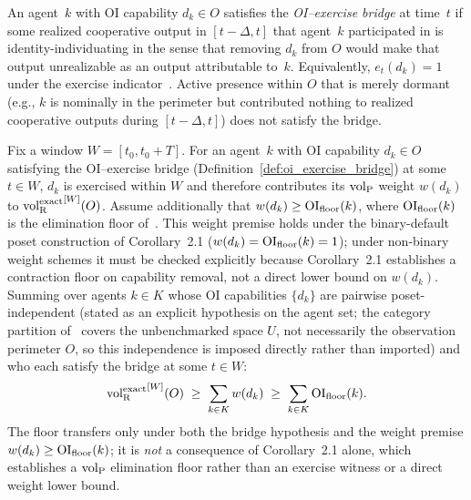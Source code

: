 \begin{definition}
\label{def:oi_exercise_bridge}
An agent~$k$ with OI capability $d_k \in O$ satisfies the
\emph{OI--exercise bridge} at time~$t$ if some realized
cooperative output in $[t-\Delta, t]$ that agent~$k$
participated in is identity-individuating in the sense that
removing $d_k$ from $O$ would make that output unrealizable as
an output attributable to~$k$.  Equivalently,
$e_t(d_k) = 1$ under
the exercise indicator~\citep[Revealed~Sacrifice]{lasser2026paper8a}.  Active presence within
$O$ that is merely dormant (e.g., $k$ is nominally in the
perimeter but contributed nothing to realized cooperative
outputs during $[t-\Delta, t]$) does not satisfy the bridge.
\end{definition}

\begin{proposition}
\label{prop:oi_floor}
Fix a window $W = [t_0, t_0 + T]$.  For an agent~$k$ with OI
capability $d_k \in O$ satisfying the OI--exercise bridge
(Definition~\ref{def:oi_exercise_bridge}) at some $t \in W$,
$d_k$ is exercised within $W$ and therefore contributes its
${\operatorname{vol}_{\mathrm{P}}}$ weight $w(d_k)$ to ${\operatorname{vol}_{\mathrm{R}}^{\mathrm{exact}}}^{[W]}(O)$.  Assume
additionally that $w(d_k) \geq \mathrm{OI}_{\mathrm{floor}}(k)$, where $\mathrm{OI}_{\mathrm{floor}}(k)$
is the elimination floor
of~\citep[Corollary~2.1]{lasser2026horizon}.  This weight
premise holds under the binary-default poset construction of
Corollary~2.1 ($w(d_k) = \mathrm{OI}_{\mathrm{floor}}(k) = 1$); under non-binary
weight schemes it must be checked explicitly because
Corollary~2.1 establishes a contraction floor on capability
removal, not a direct lower bound on $w(d_k)$.  Summing over
agents $k \in K$ whose OI capabilities $\{d_k\}$ are pairwise
poset-independent (stated as an explicit hypothesis on the
agent set; the category partition of~\citep[Revealed~Sacrifice]{lasser2026paper8a}
covers the unbenchmarked space $U$, not necessarily the
observation perimeter $O$, so this independence is imposed
directly rather than imported) and who each satisfy the bridge
at some $t \in W$:
\[
  {\operatorname{vol}_{\mathrm{R}}^{\mathrm{exact}}}^{[W]}(O) \;\geq\; \sum_{k \in K} w(d_k)
  \;\geq\; \sum_{k \in K} \mathrm{OI}_{\mathrm{floor}}(k).
\]
The floor transfers only under both the bridge hypothesis and
the weight premise $w(d_k) \geq \mathrm{OI}_{\mathrm{floor}}(k)$; it is \emph{not}
a consequence of Corollary~2.1 alone, which establishes a
${\operatorname{vol}_{\mathrm{P}}}$ elimination floor rather than an exercise witness or a
direct weight lower bound.
\end{proposition}

